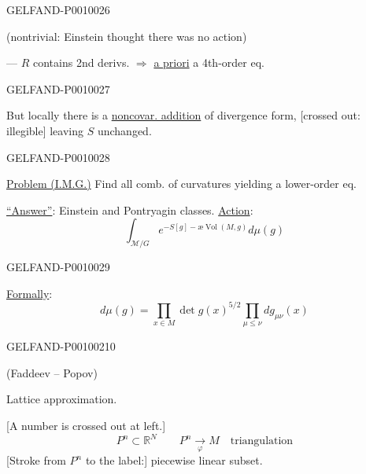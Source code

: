 \begin{GelfandAdjacentEvidence}{GELFAND-P001002}{6}


(nontrivial: Einstein thought there was no action)

--- $R$ contains 2nd derivs. $\Rightarrow$ \underline{a priori} a 4th-order eq.
\end{GelfandAdjacentEvidence}
\begin{GelfandAdjacentEvidence}{GELFAND-P001002}{7}


But locally there is a \underline{noncovar. addition} of divergence form, [crossed out: illegible] leaving $S$ unchanged.
\end{GelfandAdjacentEvidence}
\begin{GelfandAdjacentEvidence}{GELFAND-P001002}{8}


\underline{Problem (I.M.G.)} Find all comb. of curvatures yielding a lower-order eq.

\underline{“Answer”}: Einstein and Pontryagin classes. \underline{Action}:
\begin{equation*}
\int_{\mathcal M/G}e^{-S[g]-\text{æ}\operatorname{Vol}(M,g)}d\mu(g)
\tag{9}
\end{equation*}
\end{GelfandAdjacentEvidence}
\begin{GelfandAdjacentEvidence}{GELFAND-P001002}{9}


\underline{Formally}:
\begin{equation*}
d\mu(g)=\prod_{x\in M}\det g(x)^{5/2}\prod_{\mu\leq\nu}dg_{\mu\nu}(x)
\tag{10}
\end{equation*}
\end{GelfandAdjacentEvidence}
\begin{GelfandAdjacentEvidence}{GELFAND-P001002}{10}

(Faddeev -- Popov)

Lattice approximation.

[A number is crossed out at left.]
\[
P^n\subset\mathbb R^N\qquad
P^n\underset{\varphi}{\longrightarrow}M\quad\text{triangulation}
\]
[Stroke from $P^n$ to the label:] piecewise linear subset.
\end{GelfandAdjacentEvidence}



